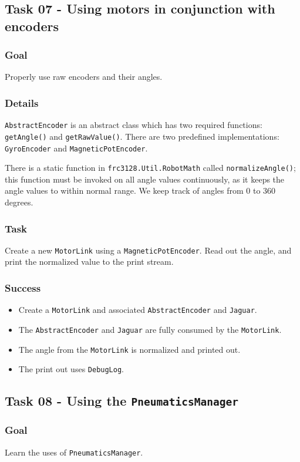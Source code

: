 \documentclass[a4paper]{article}
\begin{document}
\subsection{Task 07 - Using motors in conjunction with encoders}
\subsubsection{Goal} Properly use raw encoders and their angles.
\subsubsection{Details} \lstinline{AbstractEncoder} is an abstract class which has two required functions: \lstinline{getAngle()} and \lstinline{getRawValue()}. There are two predefined implementations: \lstinline{GyroEncoder} and \lstinline{MagneticPotEncoder}. 

There is a static function in \lstinline{frc3128.Util.RobotMath} called \lstinline{normalizeAngle()}; this function must be invoked on all angle values continuously, as it keeps the angle values to within normal range. We keep track of angles from 0 to 360 degrees. 
\subsubsection{Task} Create a new \lstinline{MotorLink} using a \lstinline{MagneticPotEncoder}. Read out the angle, and print the normalized value to the print stream.
\subsubsection{Success}\begin{itemize}\item{Create a \lstinline{MotorLink} and associated \lstinline{AbstractEncoder} and \lstinline{Jaguar}.}\item{The \lstinline{AbstractEncoder} and \lstinline{Jaguar} are fully consumed by the \lstinline{MotorLink}.}\item{The angle from the \lstinline{MotorLink} is normalized and printed out.}\item{The print out uses \lstinline{DebugLog}.}\end{itemize}

\subsection{Task 08 - Using the \lstinline{PneumaticsManager}}
\subsubsection{Goal} Learn the uses of \lstinline{PneumaticsManager}.
\end{document}
